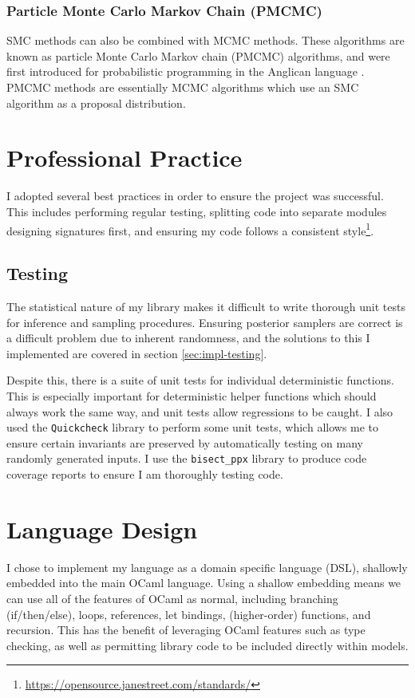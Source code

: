 \documentclass[sigconf]{acmart}
\begin{document}
\subsubsection{Particle Monte Carlo Markov Chain (PMCMC)}
SMC methods can also be combined with MCMC methods. These algorithms are known as particle Monte Carlo Markov chain (PMCMC) algorithms, and were first introduced for probabilistic programming in the Anglican language \cite{anglican-smc}. PMCMC methods are essentially MCMC algorithms which use an SMC algorithm as a proposal distribution.

\section{Professional Practice}

I adopted several best practices in order to ensure the project was successful. This includes performing regular testing, splitting code into separate modules designing signatures first, and ensuring my code follows a consistent style\footnote{\url{https://opensource.janestreet.com/standards/}}.

\subsection{Testing} \label{sec:prep-testing}
The statistical nature of my library makes it difficult to write thorough unit tests for inference and sampling procedures. Ensuring posterior samplers are correct is a difficult problem due to inherent randomness, and the solutions to this I implemented are covered in section \ref{sec:impl-testing}.

Despite this, there is a suite of unit tests for individual deterministic functions. This is especially important for deterministic helper functions which should always work the same way, and unit tests allow regressions to be caught. I also used the \texttt{Quickcheck} library to perform some unit tests, which allows me to ensure certain invariants are preserved by automatically testing on many randomly generated inputs. I use the \texttt{bisect\_ppx} library to produce code coverage reports to ensure I am thoroughly testing code.


\section{Language Design}
I chose to implement my language as a domain specific language (DSL), shallowly embedded into the main OCaml language. Using a shallow embedding means we can use all of the features of OCaml as normal, including branching (if/then/else), loops, references, let bindings, (higher-order) functions, and recursion. This has the benefit of leveraging OCaml features such as type checking, as well as permitting library code to be included directly within models.
\end{document}
